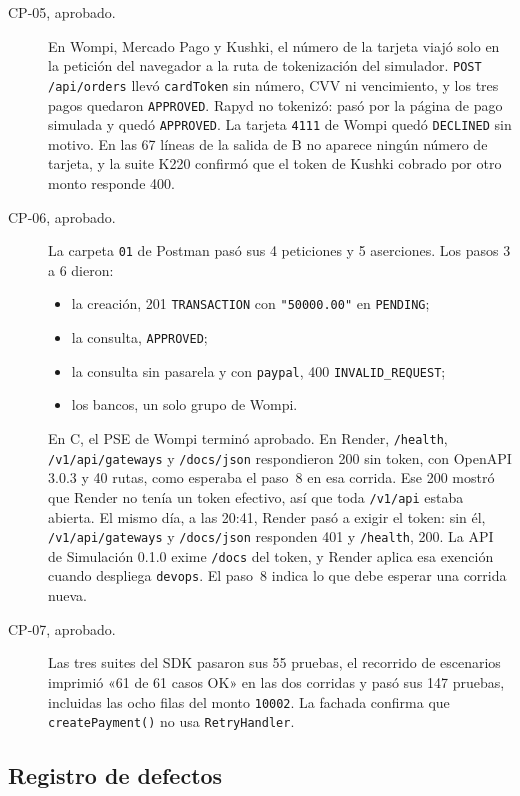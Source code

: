 \begin{description}
  \item[CP-05, aprobado.] En Wompi, Mercado Pago y Kushki, el número de la tarjeta viajó solo en la petición del navegador a la ruta de tokenización del simulador. \texttt{POST /api/orders} llevó \texttt{cardToken} sin número, CVV ni vencimiento, y los tres pagos quedaron \texttt{APPROVED}. Rapyd no tokenizó: pasó por la página de pago simulada y quedó \texttt{APPROVED}. La tarjeta \texttt{4111} de Wompi quedó \texttt{DECLINED} sin motivo. En las 67 líneas de la salida de B no aparece ningún número de tarjeta, y la suite K220 confirmó que el token de Kushki cobrado por otro monto responde 400.
  \item[CP-06, aprobado.] La carpeta \texttt{01} de Postman pasó sus 4 peticiones y 5 aserciones. Los pasos 3 a 6 dieron:
  \begin{itemize}
    \item la creación, 201 \texttt{TRANSACTION} con \texttt{"50000.00"} en \texttt{PENDING};
    \item la consulta, \texttt{APPROVED};
    \item la consulta sin pasarela y con \texttt{paypal}, 400 \texttt{INVALID\_REQUEST};
    \item los bancos, un solo grupo de Wompi.
  \end{itemize}
  En C, el PSE de Wompi terminó aprobado. En Render, \texttt{/health}, \texttt{/v1/api/gateways} y \texttt{/docs/json} respondieron 200 sin token, con OpenAPI 3.0.3 y 40 rutas, como esperaba el paso~8 en esa corrida. Ese 200 mostró que Render no tenía un token efectivo, así que toda \texttt{/v1/api} estaba abierta. El mismo día, a las 20:41, Render pasó a exigir el token: sin él, \texttt{/v1/api/gateways} y \texttt{/docs/json} responden 401 y \texttt{/health}, 200. La API de Simulación 0.1.0 exime \texttt{/docs} del token, y Render aplica esa exención cuando despliega \texttt{devops}. El paso~8 indica lo que debe esperar una corrida nueva.
  \item[CP-07, aprobado.] Las tres suites del SDK pasaron sus 55 pruebas, el recorrido de escenarios imprimió «61 de 61 casos OK» en las dos corridas y  pasó sus 147 pruebas, incluidas las ocho filas del monto \texttt{10002}. La fachada confirma que \texttt{createPayment()} no usa \texttt{RetryHandler}.
\end{description}

\subsection{Registro de defectos}

